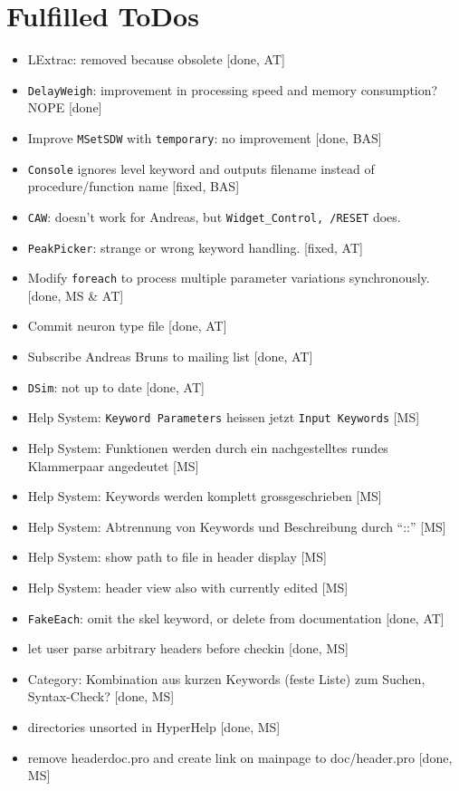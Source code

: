 \documentclass[12pt]{article}
\begin{document}
\section{Fulfilled ToDos}
\begin{itemize}
\item LExtrac: removed because obsolete [done, AT]
\item \texttt{DelayWeigh}: improvement in processing speed and memory consumption? NOPE [done]
\item Improve \texttt{MSetSDW} with \texttt{temporary}: no improvement [done, BAS]
\item \texttt{Console} ignores level keyword and outputs filename instead of procedure/function name [fixed, BAS]
\item \texttt{CAW}: doesn't work for Andreas, but \texttt{Widget_Control, /RESET} does.
\item \texttt{PeakPicker}: strange or wrong keyword handling. [fixed, AT]
\item Modify \texttt{foreach} to process multiple parameter variations synchronously. [done, MS & AT] 
\item Commit neuron type file [done, AT]
\item Subscribe Andreas Bruns to mailing list [done, AT] 
\item \texttt{DSim}: not up to date [done, AT]
\item Help System: \texttt{Keyword Parameters} heissen jetzt \texttt{Input Keywords} [MS]
\item Help System: Funktionen werden durch ein nachgestelltes rundes Klammerpaar angedeutet [MS]
\item Help System: Keywords werden komplett grossgeschrieben [MS]
\item Help System: Abtrennung von Keywords und Beschreibung durch ``::'' [MS]
\item Help System: show path to file in header display [MS]
\item Help System: header view also with currently edited [MS]
\item \texttt{FakeEach}: omit the skel keyword, or delete from documentation [done, AT]
\item let user parse arbitrary headers before checkin [done, MS]
\item Category: Kombination aus kurzen Keywords (feste Liste) zum Suchen, Syntax-Check? [done, MS]
\item directories unsorted in HyperHelp [done, MS]
\item remove headerdoc.pro and create link on mainpage to doc/header.pro [done, MS]

\end{itemize}
\end{document}
